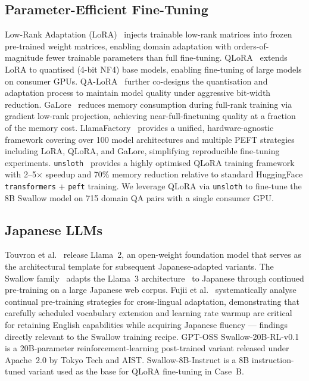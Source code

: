 \documentclass[twocolumn]{article}
\begin{document}
\subsection{Parameter-Efficient Fine-Tuning}

Low-Rank Adaptation (LoRA)~\cite{hu2022lora} injects trainable low-rank matrices into frozen
pre-trained weight matrices, enabling domain adaptation with orders-of-magnitude fewer
trainable parameters than full fine-tuning.
QLoRA~\cite{dettmers2023qlora} extends LoRA to quantised (4-bit NF4) base models, enabling
fine-tuning of large models on consumer GPUs.
QA-LoRA~\cite{xu2023qalora} further co-designs the quantisation and adaptation process to
maintain model quality under aggressive bit-width reduction.
GaLore~\cite{zhao2024galore} reduces memory consumption during full-rank training via gradient
low-rank projection, achieving near-full-finetuning quality at a fraction of the memory cost.
LlamaFactory~\cite{zheng2024llamafactory} provides a unified, hardware-agnostic framework
covering over 100 model architectures and multiple PEFT strategies including LoRA, QLoRA,
and GaLore, simplifying reproducible fine-tuning experiments.
\texttt{unsloth}~\cite{han2023unsloth} provides a highly optimised QLoRA training framework
with 2--5$\times$ speedup and 70\% memory reduction relative to standard HuggingFace
\texttt{transformers} + \texttt{peft} training.
We leverage QLoRA via \texttt{unsloth} to fine-tune the 8B Swallow model on 715 domain
QA pairs with a single consumer GPU.

\subsection{Japanese LLMs}

Touvron et al.~\cite{touvron2023llama2} release Llama~2, an open-weight foundation model
that serves as the architectural template for subsequent Japanese-adapted variants.
The Swallow family~\cite{okazaki2024swallow} adapts the Llama~3 architecture~\cite{meta2024llama3}
to Japanese through continued pre-training on a large Japanese web corpus.
Fujii et al.~\cite{fujii2024continual} systematically analyse continual pre-training
strategies for cross-lingual adaptation, demonstrating that carefully scheduled vocabulary
extension and learning rate warmup are critical for retaining English capabilities while
acquiring Japanese fluency — findings directly relevant to the Swallow training recipe.
GPT-OSS Swallow-20B-RL-v0.1 is a 20B-parameter reinforcement-learning post-trained variant
released under Apache~2.0 by Tokyo Tech and AIST.
Swallow-8B-Instruct is a 8B instruction-tuned variant used as the base for QLoRA fine-tuning
in Case~B.
\end{document}
